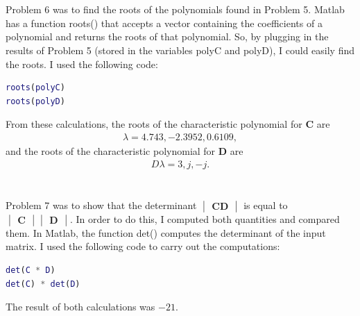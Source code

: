 \documentclass{article}
\begin{document}
\section{}

Problem 6 was to find the roots of the polynomials found in Problem 5.  Matlab has a function roots() that accepts a vector containing the coefficients of a polynomial and returns the roots of that polynomial.  So, by plugging in the results of Problem 5 (stored in the variables polyC and polyD), I could easily find the roots.  I used the following code:

\begin{lstlisting}[language=Matlab]
% Find the roots of the polynomials.
roots(polyC)
roots(polyD)
\end{lstlisting}

From these calculations, the roots of the characteristic polynomial for \textbf{C} are
\begin{align*}
    \lambda = 4.743, -2.3952, 0.6109,
\end{align*}
and the roots of the characteristic polynomial for \textbf{D} are
\begin{align*}D
    \lambda = 3, j, -j.
\end{align*}

\section{}

Problem 7 was to show that the determinant $\begin{vmatrix}\textbf{CD}\end{vmatrix}$ is equal to $\begin{vmatrix}\textbf{C}\end{vmatrix}\begin{vmatrix}\textbf{D}\end{vmatrix}$.  In order to do this, I computed both quantities and compared them.  In Matlab, the function det() computes the determinant of the input matrix.  I used the following code to carry out the computations:

\begin{lstlisting}[language=Matlab]
% Show that the determinant |CD| is equal to |C||D|.
det(C * D)
det(C) * det(D)
\end{lstlisting}

The result of both calculations was $-21$.

\section{}
\end{document}

